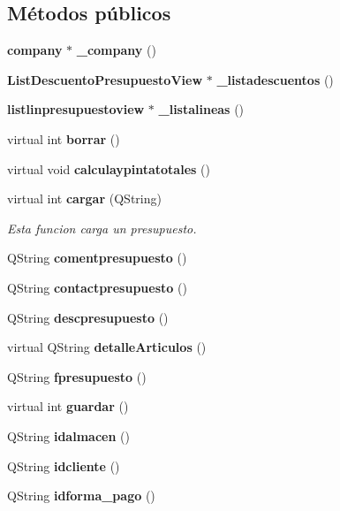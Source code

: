 \subsection*{M\'{e}todos p\'{u}blicos}
\begin{CompactItemize}
\item 
{\bf company} $\ast$ {\bf \_\-company} ()\label{classpresupuesto_a0}

\item 
{\bf List\-Descuento\-Presupuesto\-View} $\ast$ {\bf \_\-listadescuentos} ()\label{classpresupuesto_a1}

\item 
{\bf listlinpresupuestoview} $\ast$ {\bf \_\-listalineas} ()\label{classpresupuesto_a2}

\item 
virtual int {\bf borrar} ()\label{classpresupuesto_a3}

\item 
virtual void {\bf calculaypintatotales} ()
\item 
virtual int {\bf cargar} (QString)
\begin{CompactList}\small\item\em Esta funcion carga un presupuesto. \item\end{CompactList}\item 
QString {\bf comentpresupuesto} ()\label{classpresupuesto_a6}

\item 
QString {\bf contactpresupuesto} ()\label{classpresupuesto_a7}

\item 
QString {\bf descpresupuesto} ()\label{classpresupuesto_a8}

\item 
virtual QString {\bf detalle\-Articulos} ()\label{classpresupuesto_a9}

\item 
QString {\bf fpresupuesto} ()\label{classpresupuesto_a10}

\item 
virtual int {\bf guardar} ()\label{classpresupuesto_a11}

\item 
QString {\bf idalmacen} ()\label{classpresupuesto_a12}

\item 
QString {\bf idcliente} ()\label{classpresupuesto_a13}

\item 
QString {\bf idforma\_\-pago} ()\label{classpresupuesto_a14}


\end{CompactItemize}
